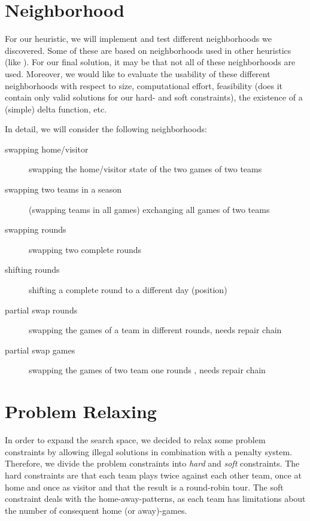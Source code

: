 \documentclass[a4paper,11pt]{article}
\begin{document}
\section{Neighborhood}
For our heuristic, we will implement and test different neighborhoods we discovered. Some of these are based on neighborhoods used in other heuristics (like \cite{Gaspero07,rvk2008}).
For our final solution, it may be that not all of these neighborhoods are used. Moreover, we would like to evaluate the usability of these different neighborhoods with respect to size, computational effort, feasibility (does it contain only valid solutions for our hard- and soft constraints), the existence of a (simple) delta function, etc.

In detail, we will consider the following neighborhoods:
\begin{description}
	\item[swapping home/visitor] swapping the home/visitor state of the two games of two teams
	\item[swapping two teams in a season] (swapping teams in all games) exchanging all games of two teams
	\item[swapping rounds] swapping two complete rounds
	\item[shifting rounds] shifting a complete round to a different day (position)
	\item[partial swap rounds] swapping the games of a team in different rounds, \cite{Gaspero07,HentenryckV06, Chen_anant} needs repair chain
	\item[partial swap games] swapping the games of two team one rounds \cite{Gaspero07, HentenryckV06}, needs repair chain
\end{description}

\section{Problem Relaxing}
In order to expand the search space, we decided to relax some problem constraints by allowing illegal solutions in combination with a penalty system.
Therefore, we divide the problem constraints into \emph{hard} and \emph{soft} constraints. The hard constraints are that each team plays twice against each other team, once at home and once as visitor and that the result is a round-robin tour. The soft constraint deals with the home-away-patterns, as each team has limitations about the number of consequent home (or away)-games.
\end{document}

